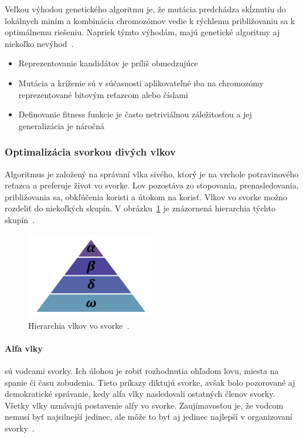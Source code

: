 \documentclass[a4paper,slovak,12pt,appendix]{article}
\begin{document}
Veľkou výhodou genetického algoritmu je, že mutácia predchádza skĺznutiu do
lokálnych miním a kombinácia chromozómov vedie k rýchlemu približovaniu
sa k optimálnemu riešeniu. Napriek týmto výhodám, majú genetické algoritmy aj
niekoľko nevýhod~\cite{Deolekar2016}.
\begin{itemize}
  \item Reprezentovanie kandidátov je príliš obmedzujúce
  \item Mutácia a kríženie sú v súčasnosti aplikovateľné iba na chromozómy
        reprezentované bitovým reťazcom alebo číslami
  \item Definovanie fitness funkcie je často netriviálnou záležitosťou
        a jej generalizácia je náročná
\end{itemize}


\subsubsection{Optimalizácia svorkou divých vlkov}
Algoritmus je založený na správaní vlka sivého, ktorý je na vrchole
potravinového reťazca a preferuje život vo svorke. Lov pozostáva zo stopovania,
prenasledovania, približovania sa, obkľúčenia koristi a útokom na korisť. Vlkov
vo svorke možno rozdeliť do niekoľkých skupín.
V obrázku~\ref{fig-wolf-hierarchy} je znázornená hierarchia týchto
skupín~\cite{Seeley1991}.

\begin{figure}[!ht]
  \centering
  \includegraphics[width=0.5\textwidth]{wolf_hierarchy.png}
  \caption[Hierarchia vlkov vo svorke.]{Hierarchia vlkov vo svorke~\cite{Seeley1991}.}
  \label{fig-wolf-hierarchy}
\end{figure}

\paragraph{Alfa vlky} sú vodcami svorky. Ich úlohou je robiť rozhodnutia
ohľadom lovu, miesta na spanie či času zobudenia. Tieto príkazy diktujú svorke,
avšak bolo pozorované aj demokratické správanie, kedy alfa vlky nasledovali
ostatných členov svorky. Všetky vlky uznávajú postavenie alfy vo svorke.
Zaujímavosťou je, že vodcom nemusí byť najsilnejší jedinec, ale môže to
byť aj jedinec najlepší v organizovaní svorky~\cite{Seeley1991}.
\end{document}
